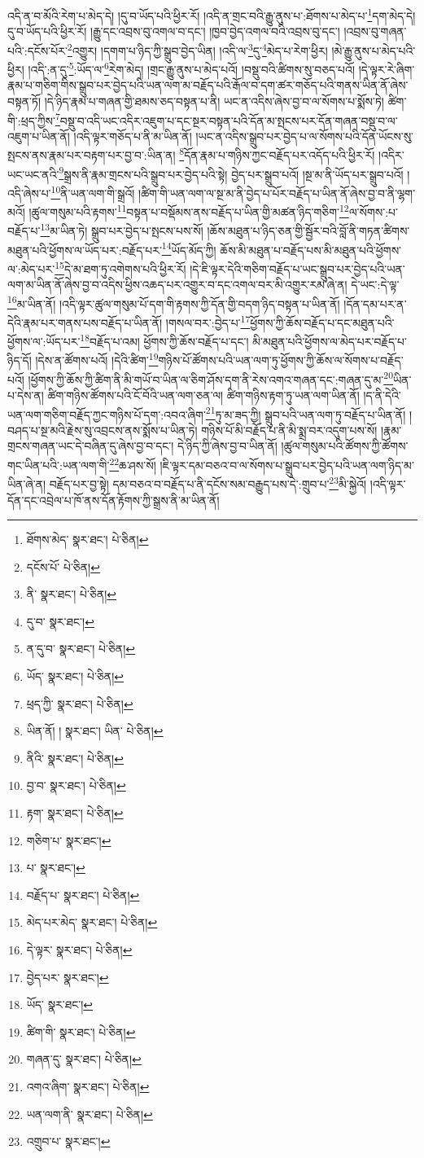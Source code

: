 འདི་ན་བ་མོའི་རེག་པ་མེད་དེ། །དུ་བ་ཡོད་པའི་ཕྱིར་རོ། །འདི་ན་གྲང་བའི་རྒྱུ་ནུས་པ་:ཐོགས་པ་མེད་པ་\footnote{ཐོགས་མེད་  སྣར་ཐང་།  པེ་ཅིན། }དག་མེད་དེ། དུ་བ་ཡོད་པའི་ཕྱིར་རོ། །རྒྱུ་དང་འབྲས་བུ་འགལ་བ་དང་། །ཁྱབ་བྱེད་འགལ་བའི་འབྲས་བུ་དང་། །འབྲས་བུ་གཞན་པའི་:དངོས་པོར་\footnote{དངོས་པོ་  པེ་ཅིན། }འགྱུར། །དགག་པ་ཉིད་ཀྱི་སྒྲུབ་བྱེད་ཡིན། །འདི་ལ་\footnote{ནི་  སྣར་ཐང་།  པེ་ཅིན། }དུ་\footnote{དུ་བ་  སྣར་ཐང་། }མེད་པ་རེག་ཕྱིར། །མེ་རྒྱུ་ནུས་པ་མེད་པའི་ཕྱིར། །འདི་:ན་དུ་\footnote{ན་དུ་བ་  སྣར་ཐང་།  པེ་ཅིན། }:ཡོད་ལ་\footnote{ཡོད་  སྣར་ཐང་།  པེ་ཅིན། }རེག་མེད། །གྲང་རྒྱུ་ནུས་པ་མེད་པའོ། །བསྡུ་བའི་ཚིགས་སུ་བཅད་པའོ། །དེ་ལྟར་རེ་ཞིག་རྣམ་པ་གཅིག་གིས་སྒྲུབ་པར་བྱེད་པའི་ཡན་ལག་མ་བརྗོད་པའི་རྒོལ་བ་དག་ཚར་གཅོད་པའི་གནས་ཡིན་ནོ་ཞེས་བསྟན་ཏོ། །དེ་ཉིད་རྣམ་པ་གཞན་གྱི་ཐམས་ཅད་བསྟན་པ་ནི། ཡང་ན་འདིས་ཞེས་བྱ་བ་ལ་སོགས་པ་སྨོས་ཏེ། ཚིག་གི་:ཕྲད་ཀྱིས་\footnote{ཕྲད་ཀྱི་  སྣར་ཐང་།  པེ་ཅིན། }བསྡུ་བ་འདི་ཡང་འདིར་འཇུག་པ་དང་སྔར་བསྟན་པའི་དོན་མ་སྤངས་པར་དོན་གཞན་བསྡུ་བ་ལ་འཇུག་པ་ཡིན་ནོ། །འདི་ལྟར་གཅོད་པ་ནི་མ་ཡིན་ནོ། །ཡང་ན་འདིས་སྒྲུབ་པར་བྱེད་པ་ལ་སོགས་པའི་དོན་ཡོངས་སུ་སྤངས་ནས་རྣམ་པར་བརྟག་པར་བྱ་བ་:ཡིན་ན། \footnote{ཡིན་ནོ། །   སྣར་ཐང་། ཡིན་  པེ་ཅིན། }དོན་རྣམ་པ་གཉིས་ཀྱང་བརྗོད་པར་འདོད་པའི་ཕྱིར་རོ། །འདིར་ཡང་ཡང་ནའི་\footnote{ནིའི་  སྣར་ཐང་།  པེ་ཅིན། }སྒྲས་ནི་རྣམ་གྲངས་པའི་སྒྲུབ་པར་བྱེད་པའི་སྟེ། བྱེད་པར་སྒྲུབ་པའོ། །སྔ་མ་ནི་ཡོད་པར་སྒྲུབ་པའོ། །འདི་ཞེས་པ་\footnote{བྱ་བ་  སྣར་ཐང་།  པེ་ཅིན། }ནི་ཡན་ལག་གི་སྒྲའོ། །ཚིག་གི་ཡན་ལག་ལ་སྔ་མ་ནི་བྱེད་པ་པོར་བརྗོད་པ་ཡིན་ནོ་ཞེས་བྱ་བ་ནི་ལྷག་མའོ། །ཚུལ་གསུམ་པའི་རྟགས་\footnote{རྟག་  སྣར་ཐང་།  པེ་ཅིན། }བསྟན་པ་བསྡོམས་ནས་བརྗོད་པ་ཡིན་གྱི་མཚན་ཉིད་གཅིག་\footnote{གཅིག་པ་  སྣར་ཐང་། }ལ་སོགས་:པ་བརྗོད་པ་\footnote{པ་  སྣར་ཐང་། }མ་ཡིན་ཏེ། སྒྲུབ་པར་བྱེད་པ་སྤངས་པས་སོ། །ཆོས་མཐུན་པ་ཉིད་ཅན་གྱི་སྦྱོར་བའི་བློ་ནི་གཏན་ཚིགས་མཐུན་པའི་ཕྱོགས་ལ་ཡོད་པར་:བརྗོད་པར་\footnote{བརྗོད་པ་  སྣར་ཐང་།  པེ་ཅིན། }ཡོད་མོད་ཀྱི། ཆོས་མི་མཐུན་པ་བརྗོད་པས་མི་མཐུན་པའི་ཕྱོགས་ལ་:མེད་པར་\footnote{མེད་པར་མེད་  སྣར་ཐང་།  པེ་ཅིན། }དེ་མ་ཐག་ཏུ་འགེགས་པའི་ཕྱིར་རོ། །དེ་ཇི་ལྟར་དེའི་གཅིག་བརྗོད་པ་ཡང་སྒྲུབ་པར་བྱེད་པའི་ཡན་ལག་མ་ཡིན་ནོ་ཞེས་བྱ་བ་འདིས་ཕྱིས་འཆད་པར་འགྱུར་བ་དང་འགལ་བར་མི་འགྱུར་རམ་ཞེ་ན། དེ་ཡང་:དེ་ལྟ་\footnote{དེ་ལྟར་  སྣར་ཐང་།  པེ་ཅིན། }མ་ཡིན་ནོ། །འདི་ལྟར་ཚུལ་གསུམ་པོ་དག་གི་རྟགས་ཀྱི་དོན་གྱི་བདག་ཉིད་བསྟན་པ་ཡིན་ནོ། །དོན་དམ་པར་ན་དེའི་རྣམ་པར་གནས་པས་བརྗོད་པ་ཡིན་ནོ། །གསལ་བར་:བྱེད་པ་\footnote{བྱེད་པར་  སྣར་ཐང་། }ཕྱོགས་ཀྱི་ཆོས་བརྗོད་པ་དང་མཐུན་པའི་ཕྱོགས་ལ་:ཡོད་པར་\footnote{ཡོད་  སྣར་ཐང་། }བརྗོད་པ་འམ། ཕྱོགས་ཀྱི་ཆོས་བརྗོད་པ་དང་། མི་མཐུན་པའི་ཕྱོགས་ལ་མེད་པར་བརྗོད་པ་ཉིད་དོ། །དེས་ན་ཚོགས་པའོ། །དེའི་ཚིག་\footnote{ཚིག་གི་  སྣར་ཐང་།  པེ་ཅིན། }གཉིས་པོ་ཚོགས་པའི་ཡན་ལག་ཏུ་ཕྱོགས་ཀྱི་ཆོས་ལ་སོགས་པ་བརྗོད་པའོ། །ཕྱོགས་ཀྱི་ཆོས་ཀྱི་ཚིག་ནི་མི་གཡོ་བ་ཡིན་ལ་ཅིག་ཤོས་དག་ནི་རེས་འགའ་གཞན་དང་:གཞན་དུ་མ་\footnote{གཞན་དུ་  སྣར་ཐང་།  པེ་ཅིན། }ཡིན་པ་དེས་ན། ཚིག་གཉིས་ཚོགས་པའི་ངོ་བོའི་ཡན་ལག་ཅན་ལ། ཚིག་གཉིས་རྟག་ཏུ་ཡན་ལག་ཡིན་ནོ། །ད་ནི་དེའི་ཡན་ལག་གཅིག་བརྗོད་ཀྱང་གཉིས་པོ་དག་:འབའ་ཞིག་\footnote{འགའ་ཞིག་  སྣར་ཐང་།  པེ་ཅིན། }ཏུ་མ་ཟད་ཀྱི། སྒྲུབ་པའི་ཡན་ལག་ཏུ་བརྗོད་པ་ཡིན་ནོ། །བཤད་པ་སྔ་མའི་རྗེས་སུ་འབྲངས་ནས་སྨོས་པ་ཡིན་ཏེ། གཉིས་པོ་མི་བརྗོད་པ་ནི་མི་སྨྲ་བར་འདུག་པས་སོ། །རྣམ་གྲངས་གཞན་ཡང་དེ་བཞིན་དུ་ཞེས་བྱ་བ་དང་། དེ་ཉིད་ཀྱི་ཞེས་བྱ་བ་ཡིན་ནོ། །ཚུལ་གསུམ་པའི་ཚོགས་ཀྱི་ཚོགས་གང་ཡིན་པའི་:ཡན་ལག་གི་\footnote{ཡན་ལག་ནི་  སྣར་ཐང་།  པེ་ཅིན། }ཆ་ཤས་སོ། །ཇི་ལྟར་དམ་བཅའ་བ་ལ་སོགས་པ་སྒྲུབ་པར་བྱེད་པའི་ཡན་ལག་ཉིད་མ་ཡིན་ཞེ་ན། བརྗོད་པར་བྱ་སྟེ། དམ་བཅའ་བ་བརྗོད་པ་ནི་དངོས་སམ་བརྒྱུད་པས་དེ་:གྲུབ་པ་\footnote{འགྲུབ་པ་  སྣར་ཐང་། }མི་སྐྱེའོ། །འདི་ལྟར་དོན་དང་འབྲེལ་པ་ཁོ་ནས་དོན་རྟོགས་ཀྱི་སྒྲས་ནི་མ་ཡིན་ནོ། 
